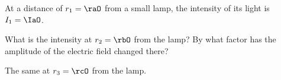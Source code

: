 At a distance of $r_1 = \raO$ from a small lamp, the intensity of its light is $I_1 = \IaO$.

\begin{abcliste}
\abc What is the intensity at $r_2 = \rbO$ from the lamp? By what factor has the amplitude of the electric field changed there?

\abc The same at $r_3 = \rcO$ from the lamp.
\end{abcliste}
